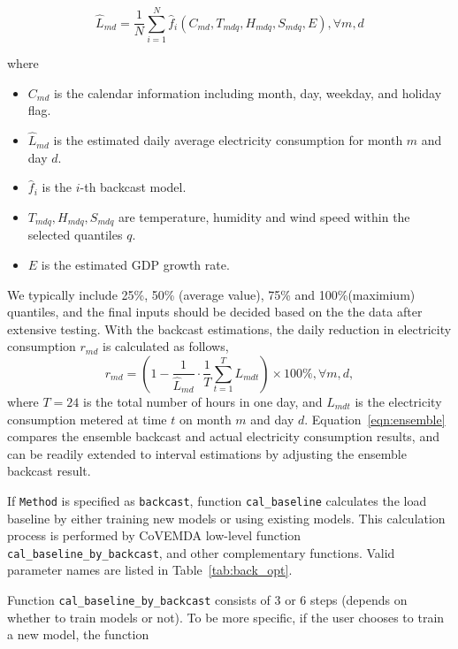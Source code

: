 \documentclass[11pt]{article}
\newcommand{\covemda}{CoVEMDA}
\numberwithin{equation}{section}
\numberwithin{table}{section}
\numberwithin{figure}{section}
\begin{document}
\begin{equation*}
  \hat L_{md}=\frac{1}{N}\sum\limits_{i=1}^N \hat f_i(C_{md}, T_{mdq}, H_{mdq}, S_{mdq}, E),\forall m,d
\end{equation*}

where 
\begin{itemize}
  \item $C_{md}$ is the calendar information including month, day, weekday, and holiday flag.
  \item $\hat L_{md}$ is the estimated daily average electricity consumption for month $m$ and day $d$.
  \item $\hat f_i$ is the $i$-th backcast model.
  \item $T_{mdq},H_{mdq},S_{mdq}$ are temperature, humidity and wind speed within the selected quantiles $q$.
  \item $E$ is the estimated GDP growth rate.
\end{itemize}
We typically include 25\%, 50\% (average value), 75\% and 100\%(maximium) quantiles, and the final inputs should be decided based on the the data after extensive testing. With the backcast estimations, the daily reduction in electricity consumption $r_{md}$ is calculated as follows,
\begin{equation}
  \label{eqn:ensemble}
  r_{md}=(1-\frac{1}{\hat L_{md}}\cdot \frac{1}{T}\sum\limits_{t=1}^TL_{mdt})\times 100\%, \forall m,d,
\end{equation}
where $T=24$ is the total number of hours in one day, and $L_{mdt}$ is the electricity consumption metered at time $t$ on month $m$ and day $d$. Equation~\ref{eqn:ensemble} compares the ensemble backcast and actual electricity consumption results, and can be readily extended to interval estimations by adjusting the ensemble backcast result.


If \verb!Method! is specified as \verb!backcast!, function \verb!cal_baseline! calculates the load baseline by either training new models or using existing models. This calculation process is performed by \covemda{} low-level function \verb!cal_baseline_by_backcast!, and other complementary functions. Valid parameter names are listed in Table~\ref{tab:back_opt}.

Function \verb!cal_baseline_by_backcast! consists of 3 or 6 steps (depends on whether to train models or not). To be more specific, if the user chooses to train a new model, the function
\end{document}
